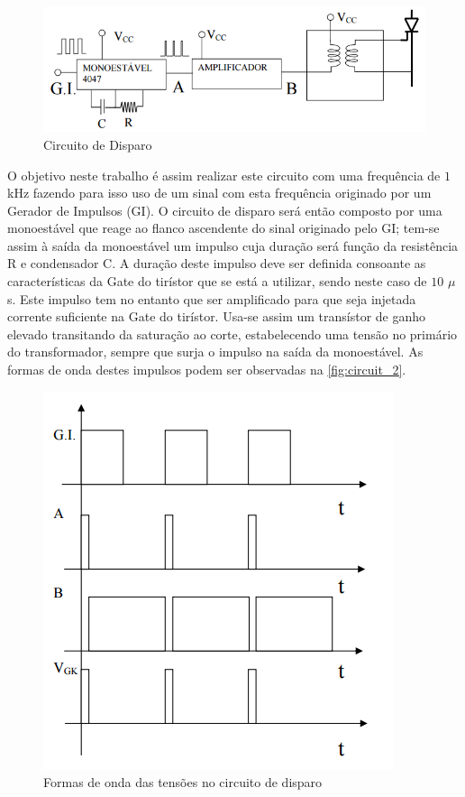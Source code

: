 \documentclass[a4paper,11pt]{article}
\numberwithin{equation}{section}
\begin{document}
\begin{figure}[h]
	\centering
	\includegraphics[width=\linewidth]{img/trigger_circuit}
	\caption{Circuito de Disparo}
	\label{fig:circuit_1}
\end{figure}

O objetivo neste trabalho é assim realizar este circuito com uma frequência de $1$ kHz fazendo para isso uso de um sinal com esta frequência originado por um Gerador de Impulsos (GI). O circuito de disparo será então composto por uma monoestável que reage ao flanco ascendente do sinal originado pelo GI; tem-se assim à saída da monoestável um impulso cuja duração será função da resistência R e condensador C. A duração deste impulso deve ser definida consoante as características da Gate do tirístor que se está a utilizar, sendo neste caso de $10$ $\mu$s. Este impulso tem no entanto que ser amplificado para que seja injetada corrente suficiente na Gate do tirístor. Usa-se assim um transístor de ganho elevado transitando da saturação ao corte, estabelecendo uma tensão no primário do transformador, sempre que surja o impulso na saída da monoestável. As formas de onda destes impulsos podem ser observadas na \autoref{fig:circuit_2}.

\begin{figure}[h]
	\centering
	\includegraphics[width=\linewidth]{img/trigger_waveform}
	\caption{Formas de onda das tensões no circuito de disparo}
	\label{fig:circuit_2}
\end{figure}
\end{document}
